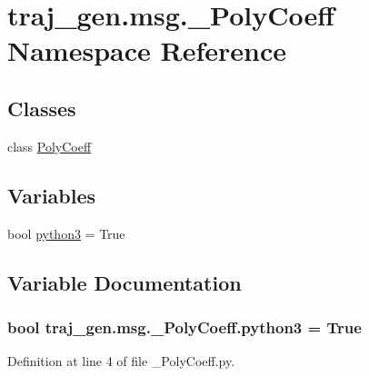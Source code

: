 \hypertarget{namespacetraj__gen_1_1msg_1_1___poly_coeff}{}\section{traj\+\_\+gen.\+msg.\+\_\+\+Poly\+Coeff Namespace Reference}
\label{namespacetraj__gen_1_1msg_1_1___poly_coeff}
\subsection*{Classes}
\begin{DoxyCompactItemize}
\item 
class \hyperlink{classtraj__gen_1_1msg_1_1___poly_coeff_1_1_poly_coeff}{Poly\+Coeff}
\end{DoxyCompactItemize}
\subsection*{Variables}
\begin{DoxyCompactItemize}
\item 
bool \hyperlink{namespacetraj__gen_1_1msg_1_1___poly_coeff_ae16b346ac660f6d9e483044d227aef38}{python3} = True
\end{DoxyCompactItemize}


\subsection{Variable Documentation}
\subsubsection[{\texorpdfstring{python3}{python3}}]{\setlength{\rightskip}{0pt plus 5cm}bool traj\+\_\+gen.\+msg.\+\_\+\+Poly\+Coeff.\+python3 = True}\hypertarget{namespacetraj__gen_1_1msg_1_1___poly_coeff_ae16b346ac660f6d9e483044d227aef38}{}\label{namespacetraj__gen_1_1msg_1_1___poly_coeff_ae16b346ac660f6d9e483044d227aef38}


Definition at line 4 of file \+\_\+\+Poly\+Coeff.\+py.

